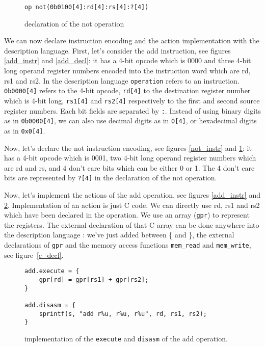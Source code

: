 \begin{figure}[h!tb]
\begin{center}
\begin{verbatim}
op not(0b0100[4]:rd[4]:rs[4]:?[4])
\end{verbatim}
\label{not_decl}
\caption{declaration of the not operation}
\end{center}
\end{figure}

We can now declare instruction encoding and the action implementation with the description language. First, let's consider the add instruction, see figures \ref{add_instr} and \ref{add_decl}: it has a 4-bit opcode
which is 0000 and three 4-bit long operand register numbers encoded into the instruction word which are rd, rs1 and rs2. In the description language \texttt{operation} refers to an instruction.
\texttt{0b0000[4]} refers to the 4-bit opcode, \texttt{rd[4]} to the destination register number which is 4-bit long, \texttt{rs1[4]} and \texttt{rs2[4]} respectively
to the first and second source register numbers. Each bit fields are separated by \texttt{:}. Instead of using binary digits as in \texttt{0b0000[4]}, we can also use decimal digits as in \texttt{0[4]}, or
hexadecimal digits as in \texttt{0x0[4]}.

Now, let's declare the not instruction encoding, see figures \ref{not_instr} and \ref{not_decl}:  it has a 4-bit opcode which is 0001, two 4-bit long operand register numbers which are rd and rs, and 4 don't care bits which can be either 0 or 1.
The 4 don't care bits are represented by \texttt{?[4]} in the declaration of the not operation.

Now, let's implement the actions of the add operation, see figures \ref{add_instr} and \ref{add_impl}. Implementation of an action is just C code.
We can directly use rd, rs1 and rs2 which have been declared in the operation. We use an array (\texttt{gpr}) to represent the registers. The external declaration of that C array can be done anywhere into the description language : we've just added between \{ and \}, the external declarations of \texttt{gpr} and the memory access functions \texttt{mem\_read} and \texttt{mem\_write}, see figure~\ref{c_decl}.

\begin{figure}[h!tb]
\begin{center}
\begin{verbatim}
add.execute = {
    gpr[rd] = gpr[rs1] + gpr[rs2];
}

add.disasm = {
    sprintf(s, "add r%u, r%u, r%u", rd, rs1, rs2);
}
\end{verbatim}
\caption{implementation of the \texttt{execute} and \texttt{disasm} of the add operation.}
\label{add_impl}
\end{center}
\end{figure}

